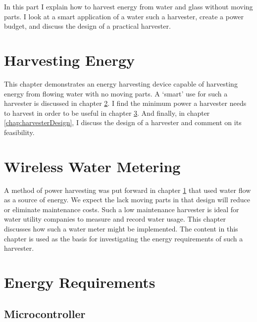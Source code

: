     In this part I explain how to harvest energy from water and glass without moving parts.
    I look at a smart application of a water such a harvester, create a power budget, and discuss the design of a practical harvester.

    \chapter{Harvesting Energy}
        \label{chap:harvestingEnergy}

        This chapter demonstrates an energy harvesting device capable of harvesting energy from flowing water with no moving parts.
        A `smart' use for such a harvester is discussed in chapter \ref{chap:wirelessWaterMetering}.
        I find the minimum power a harvester needs to harvest in order to be useful in chapter \ref{chap:energyRequirements}.
        And finally, in chapter \ref{chap:harvesterDesign}, I discuss the design of a harvester and comment on its feasibility.

        

    \chapter{Wireless Water Metering}
        \label{chap:wirelessWaterMetering}

        A method of power harvesting was put forward in chapter \ref{chap:harvestingEnergy} that used water flow as a source of energy.
        We expect the lack moving parts in that design will reduce or eliminate maintenance costs.
        Such a low maintenance harvester is ideal for water utility companies to measure and record water usage.
        This chapter discusses how such a water meter might be implemented.
        The content in this chapter is used as the basis for investigating the energy requirements of such a harvester.

        

    \chapter{Energy Requirements}
        \label{chap:energyRequirements}
        
        \section{Microcontroller}
            
        
